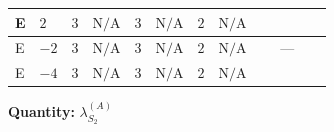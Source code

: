 \documentclass[8pt]{article}
\begin{document}
\begin{landscape}
\begin{longtable}{@{}llcccccc >{\raggedright\arraybackslash}p{0.21\linewidth} >{\raggedright\arraybackslash}p{0.21\linewidth} >{\raggedright\arraybackslash}p{0.21\linewidth}@{}}
\midrule
E & $2$ & $3$ & $\text{N/A}$ & $3$ & $\text{N/A}$ & $2$ & $\text{N/A}$ & \scriptsize\adjustbox{max width=\linewidth}{$\begin{gathered} -2 {g_2}^4\end{gathered}$} & \scriptsize\adjustbox{max width=\linewidth}{$\begin{gathered} +{g_1}^2 \left(32 {g_2}^2-48 {\lambda_{S_2}^{(A)}}\right)\end{gathered}$} & \scriptsize\adjustbox{max width=\linewidth}{$\begin{gathered} -24 {g_2}^2 {\lambda_{S_2}^{(A)}}\end{gathered}$} \\
\midrule
E & $-2$ & $3$ & $\text{N/A}$ & $3$ & $\text{N/A}$ & $2$ & $\text{N/A}$ & \scriptsize\adjustbox{max width=\linewidth}{$\begin{gathered} -2 {g_2}^4\end{gathered}$} & --- & \scriptsize\adjustbox{max width=\linewidth}{$\begin{gathered} -24 {g_2}^2 {\lambda_{S_2}^{(A)}}\end{gathered}$} \\
\midrule
E & $-4$ & $3$ & $\text{N/A}$ & $3$ & $\text{N/A}$ & $2$ & $\text{N/A}$ & \scriptsize\adjustbox{max width=\linewidth}{$\begin{gathered} -2 {g_2}^4\end{gathered}$} & \scriptsize\adjustbox{max width=\linewidth}{$\begin{gathered} +{g_1}^2 \left(8 {g_2}^2-12 {\lambda_{S_2}^{(A)}}\right)\end{gathered}$} & \scriptsize\adjustbox{max width=\linewidth}{$\begin{gathered} -24 {g_2}^2 {\lambda_{S_2}^{(A)}}\end{gathered}$} \\
\midrule
\bottomrule
\end{longtable}
\clearpage
\noindent\textbf{Quantity: }$\lambda_{S_2}^{(A)}$\par\smallskip

\end{landscape}
\end{document}
